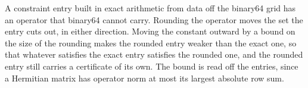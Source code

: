 
A constraint entry built in exact arithmetic from data off the binary64 grid
has an operator that binary64 cannot carry. Rounding the operator moves the
set the entry cuts out, in either direction. Moving the constant outward by a
bound on the size of the rounding makes the rounded entry weaker than the
exact one, so that whatever satisfies the exact entry satisfies the rounded
one, and the rounded entry still carries a certificate of its own. The bound
is read off the entries, since a Hermitian matrix has operator norm at most
its largest absolute row sum.


